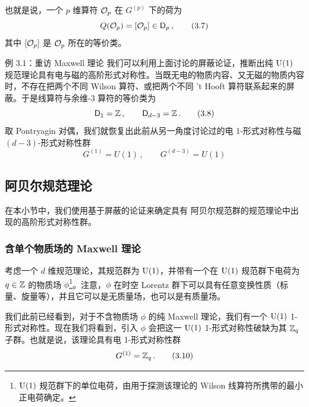 也就是说，一个 $p$ 维算符 $\mathcal{O}_p$ 在 $G^{(p)}$ 下的荷为
\begin{equation}
  Q(\mathcal{O}_p)=[\mathcal{O}_p]\in \mathsf{D}_p\,, \tag{3.7}
\end{equation}
其中 $[\mathcal{O}_p]$ 是 $\mathcal{O}_p$ 所在的等价类。


\begin{examplebox}{例 3.1：重访 Maxwell 理论}
我们可以利用上面讨论的屏蔽论证，推断出纯 $\mathrm{U}(1)$ 规范理论具有电与磁的高阶形式对称性。当既无电的物质内容、又无磁的物质内容时，不存在把两个不同 Wilson 算符、或把两个不同 't Hooft 算符联系起来的屏蔽。于是线算符与余维-3 算符的等价类为
\begin{equation}
  \mathsf{D}_1=\mathbb{Z}\,,\qquad \mathsf{D}_{d-3}=\mathbb{Z}\,. \tag{3.8}
\end{equation}
取 Pontryagin 对偶，我们就恢复出此前从另一角度讨论过的电 1-形式对称性与磁 $(d-3)$-形式对称性群
\begin{equation}
  G^{(1)}=U(1)\,,\qquad G^{(d-3)}=U(1) \tag{3.9}
\end{equation}
\end{examplebox}

\subsection{阿贝尔规范理论}

在本小节中，我们使用基于屏蔽的论证来确定具有 阿贝尔规范群的规范理论中出现的高阶形式对称性群。

\subsubsection{含单个物质场的 Maxwell 理论}

 考虑一个 $d$ 维规范理论，其规范群为 $\mathrm{U}(1)$，并带有一个在 $\mathrm{U}(1)$ 规范群下电荷为 $q\in\mathbb{Z}$ 的物质场 $\phi$\footnote{$\mathrm{U}(1)$ 规范群下的单位电荷，由用于探测该理论的 Wilson 线算符所携带的最小正电荷确定。}。注意，$\phi$ 在时空 Lorentz 群下可以具有任意变换性质（标量、旋量等），并且它可以是无质量场，也可以是有质量场。

我们此前已经看到，对于不含物质场 $\phi$ 的纯 Maxwell 理论，我们有一个 $\mathrm{U}(1)$ 1-形式对称性。现在我们将看到，引入 $\phi$ 会把这一 $\mathrm{U}(1)$ 1-形式对称性破缺为其 $\mathbb{Z}_q$ 子群。也就是说，该理论具有电 1-形式对称性群
\begin{equation}
  G^{(1)}=\mathbb{Z}_q\,. \tag{3.10}
\end{equation}

